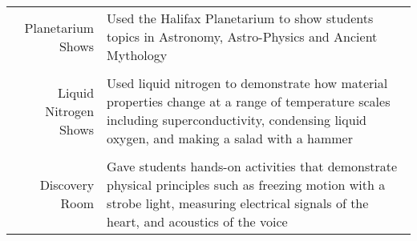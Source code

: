 \documentclass[a4paper,11pt]{article} %
\begin{document}
\begin{tabular}{r|p{11cm}}

Planetarium Shows & Used the Halifax Planetarium to show students topics in Astronomy, Astro-Physics and Ancient Mythology \\
\multicolumn{2}{c}{} \\

Liquid Nitrogen Shows & Used liquid nitrogen to demonstrate how material properties change at a range of temperature scales including superconductivity, condensing liquid oxygen, and making a salad with a hammer\\
\multicolumn{2}{c}{} \\

Discovery Room & Gave students hands-on activities that demonstrate physical principles such as freezing motion with a strobe light, measuring electrical signals of the heart, and acoustics of the voice \\

\end{tabular}


\begin{comment}
\section{Interests and Activities}

Technology, Open-Source, Programming\\
Paradoxes in Decision Making, Psychoanalysis, Behavioural Finance\\
Football, Travelling
\end{comment}



\end{document}
